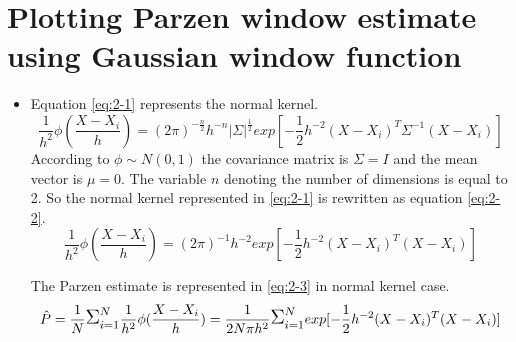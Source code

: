 \documentclass[12pt]{article}
\begin{document}
\section{Plotting Parzen window estimate using Gaussian window function}
\begin{itemize}
\item
Equation \eqref{eq:2-1} represents the normal kernel.
\begin{equation}
\frac{1}{h^2}\phi(\frac{X-X_i}{h}) = (2\pi)^{-\frac{n}{2}}h^{-n}|\Sigma|^{\frac{1}{2}}exp[-\frac{1}{2}h^{-2}(X-X_i)^T\Sigma^{-1}(X-X_i)]
\label{eq:2-1}
\end{equation}
According to $\phi \sim N(0,1)$ the covariance matrix is $\Sigma = I$ and the mean vector is $\mu = 0$. The variable $n$ denoting the number of dimensions is equal to 2. So the normal kernel represented in \eqref{eq:2-1} is rewritten as equation \eqref{eq:2-2}.
\begin{equation}
\frac{1}{h^2}\phi(\frac{X-X_i}{h}) = (2\pi)^{-1}h^{-2}exp[-\frac{1}{2}h^{-2}(X-X_i)^T(X-X_i)]
\label{eq:2-2}
\end{equation}

The Parzen estimate is represented in \eqref{eq:2-3} in normal kernel case.
\begin{equation}
\hat{P} = \frac{1}{N}\mathlarger{\mathlarger{\Sigma}}_{i=1}^N \frac{1}{h^2}\phi(\frac{X-X_i}{h}) = \frac{1}{2N\pi h^2}\mathlarger{\mathlarger{\Sigma}}_{i=1}^Nexp[-\frac{1}{2}h^{-2}(X-X_i)^T(X-X_i)]
\label{eq:2-3}
\end{equation}


\end{itemize}
\end{document}
